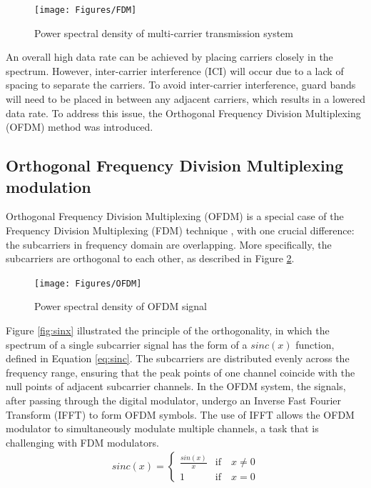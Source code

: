 \begin{figure}[htbp]
    \centering
    \texttt{[image: Figures/FDM]}
    \caption{Power spectral density of multi-carrier transmission system}
    \label{fig:FDM}
\end{figure}

An overall high data rate can be achieved by placing carriers closely in the spectrum. However, inter-carrier interference (ICI) will occur due to a lack of spacing to separate the carriers. To avoid inter-carrier interference, guard bands will need to be placed in between any adjacent carriers, which results in a lowered data rate. To address this issue, the 
Orthogonal Frequency Division Multiplexing (OFDM) method was introduced.

\subsection{Orthogonal Frequency Division Multiplexing modulation}
Orthogonal Frequency Division Multiplexing (OFDM) is a special case of the Frequency Division Multiplexing (FDM) technique \cite{OFDM2010}, with one crucial difference: the subcarriers in frequency domain are overlapping. More specifically, the subcarriers are orthogonal to each other, as described in Figure \ref{fig:OFDM}.

\begin{figure}[htbp]
    \centering
    \texttt{[image: Figures/OFDM]}
    \caption{Power spectral density of OFDM signal}
    \label{fig:OFDM}
\end{figure}

Figure \ref{fig:sinx} illustrated the principle of the orthogonality, in which the spectrum of a single subcarrier signal has the form of a $sinc(x)$ function, defined in Equation \ref{eq:sinc}. The subcarriers are distributed evenly across the frequency range, ensuring that the peak points of one channel coincide with the null points of adjacent subcarrier channels. In the OFDM system, the signals, after passing through the digital modulator, undergo an Inverse Fast Fourier Transform (IFFT) to form OFDM symbols. The use of IFFT allows the OFDM modulator to simultaneously modulate multiple channels, a task that is challenging with FDM modulators.
\begin{align}\label{eq:sinc}
    sinc(x) =
    \begin{cases}
        \frac{sin(x)}{x} &\text{if} \quad x \neq 0\\
        1 &\text{if} \quad x = 0
    \end{cases}
\end{align}

